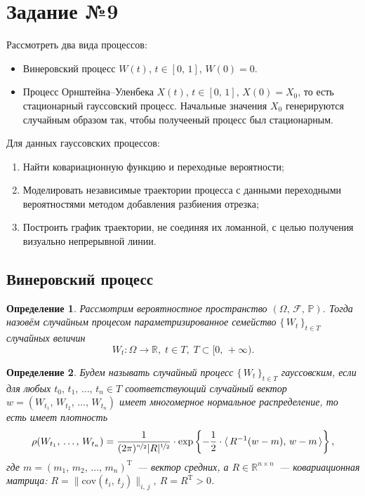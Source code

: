 \documentclass[a4paper, 11pt]{article}
\theoremstyle{def}
\newtheorem{definition}{Определение}[section]
\theoremstyle{th}
\theoremstyle{rem}
\newcommand{\R}{\mathbb{R}}
\newcommand{\p}{\mathbb{P}}
\newcommand{\T}{\mathrm{T}}
\begin{document}
\clearpage
\section{Задание №9}

Рассмотреть два вида процессов:
\begin{itemize}
        \item Винеровский процесс $W(t)$, $t \in [0,\,1]$, $W(0) = 0$.
        \item Процесс Орнштейна--Уленбека $X(t)$, $t \in [0,\,1]$, $X(0) = X_0$, то есть стационарный гауссовский процесс. Начальные значения $X_0$ генерируются случайным образом так, чтобы получееный процесс был стационарным.
\end{itemize}
Для данных гауссовских процессов:
\begin{enumerate}
        \item Найти ковариационную функцию и переходные вероятности;
        \item Моделировать независимые траектории процесса с данными переходными вероятностями методом добавления разбиения отрезка;
        \item Построить график траектории, не соединяя их ломанной, с целью получения визуально непрерывной линии.
\end{enumerate}


\subsection{Винеровский процесс}

\begin{definition}
        Рассмотрим вероятностное пространство $(\Omega,\,\mathcal{F},\,\p)$. Тогда назовём \textit{случайным процесом} параметризированное семейство $\{\,W_t\,\}_{t \in T}$ случайных величин 
$$
        W_t:\Omega\to\R,\;t\in T,\;T \subset [0,\,+\infty).
$$
\end{definition}

\begin{definition}
        Будем называть случайный процесс $\{\,W_t\,\}_{t\in T}$ \textit{гауссовским}, если для любых $t_0,\,t_1,\,\ldots,\,t_n\in T$ соответствующий случайный вектор $w = (W_{t_1},\,W_{t_2},\,\ldots,\,W_{t_n})$ имеет многомерное нормальное распределение, то есть имеет плотность
$$
        \rho(W_{t_1},\,\ldots,\,W_{t_n})
=
        \frac{1}{(2\pi)^{\nicefrac{n}{2}}|R|^{\nicefrac{1}{2}}}
\cdot
        \exp\left\{
-\frac{1}{2} \cdot
\langle\, R^{-1}(w - m),\, w - m\,\rangle
        \right\},
$$
        где $m = (m_1,\,m_2,\,\ldots,\,m_n)^\T$~--- вектор средних, а $R \in \R^{n \times n}$~--- ковариационная матрица: $R = \|\mbox{cov}(t_i,\,t_j)\|_{i,\,j}$, $R = R^\T > 0$.
\end{definition}
\end{document}
